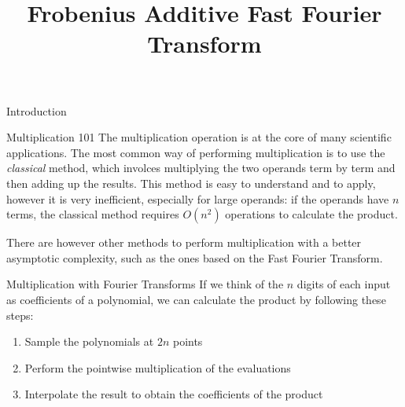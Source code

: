 \documentclass[a4paper,10pt]{article}
\title{Frobenius Additive Fast Fourier Transform}
\author{}
\begin{document}
\maketitle
\begin{section}{Introduction}
\begin{subsection}{Multiplication 101}
    The multiplication operation is at the core of many scientific applications. The most common way of performing multiplication is to use the
    \textit{classical} method, which involces multiplying the two operands term by term and then adding up the results. This method is easy to understand
    and to apply, however it is very inefficient, especially for large operands: if the operands have $n$ terms, the classical method requires $O(n^2)$
    operations to calculate the product.
    


    There are however other methods to perform multiplication with a better asymptotic complexity, such as the ones based on the Fast Fourier Transform.
    \begin{subsubsection}{Multiplication with Fourier Transforms}
    If we think of the $n$ digits of each input as coefficients of a polynomial, we can calculate the product by following these steps:
    \begin{enumerate}
        \item Sample the polynomials at $2n$ points
        \item Perform the pointwise multiplication of the evaluations
        \item Interpolate the result to obtain the coefficients of the product
    \end{enumerate}


\end{subsubsection}
\end{subsection}
\end{section}
\end{document}
